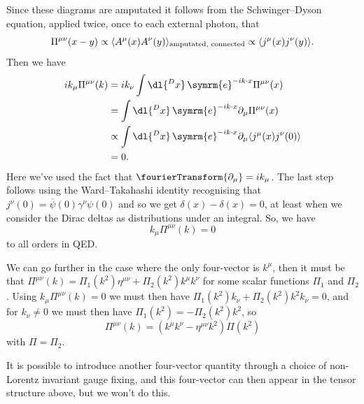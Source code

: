 \documentclass[fleqn]{NotesClass}
\newcommand{\e}{\symrm{e}}
\newcommand{\diracadjoint}[1]{\overbar{#1}}
\DeclarePairedDelimiter{\correlator}{\langle}{\rangle}
\newcommand{\minkowskiMetric}{\eta}
\begin{document}
    Since these diagrams are amputated it follows from the Schwinger--Dyson equation, applied twice, once to each external photon, that
    \begin{equation}
        \Pi^{\mu\nu}(x - y) \propto \correlator{A^\mu(x)A^\nu(y)}_{\text{amputated, connected}} \propto \correlator{j^\mu(x)j^\nu(y)}.
    \end{equation}
    Then we have
    \begin{align}
        ik_\mu \Pi^{\mu\nu}(k) &= ik_\nu \int \dl{^Dx} \, \e^{-ik\cdot x}\Pi^{\mu\nu}(x)\\
        &= \int \dl{^Dx} \, \e^{-ik\cdot x} \partial_\mu \Pi^{\mu\nu}(x)\\
        &\propto \int \dl{^Dx} \, \e^{-ik\cdot x} \partial_\mu\correlator{j^\mu(x)j^\nu(0)}\\
        &= 0.
    \end{align}
    Here we've used the fact that \(\fourierTransform\{\partial_\mu\} = ik_\mu\).
    The last step follows using the Ward--Takahashi identity recognising that \(j^\nu(0) = \diracadjoint{\psi}(0)\gamma^\nu \psi(0)\) and so we get \(\delta(x) - \delta(x) = 0\), at least when we consider the Dirac deltas as distributions under an integral.
    So, we have
    \begin{equation}
        k_\mu \Pi^{\mu\nu}(k) = 0
    \end{equation}
    to all orders in QED.
    
    We can go further in the case where the only four-vector is \(k^\mu\), then it must be that \(\Pi^{\mu\nu}(k) = \Pi_1(k^2)\minkowskiMetric^{\mu\nu} + \Pi_2(k^2)k^\mu k^\nu\) for some scalar functions \(\Pi_1\) and \(\Pi_2\).
    Using \(k_\mu \Pi^{\mu\nu}(k) = 0\) we must then have \(\Pi_1(k^2)k_\nu + \Pi_2(k^2)k^2k_\nu = 0\), and for \(k_\nu \ne 0\) we must then have \(\Pi_1(k^2) = -\Pi_2(k^2)k^2\), so
    \begin{equation}
        \Pi^{\mu\nu}(k) = (k^\mu k^\nu - \minkowskiMetric^{\mu\nu}k^2)\Pi(k^2)
    \end{equation}
    with \(\Pi = \Pi_2\).
    
    It is possible to introduce another four-vector quantity through a choice of non-Lorentz invariant gauge fixing, and this four-vector can then appear in the tensor structure above, but we won't do this.
    
\end{document}
